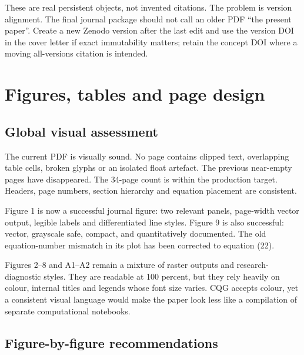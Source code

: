 \documentclass[11pt,a4paper]{article}
\begin{document}
These are real persistent objects, not invented citations. The problem is version alignment.
The final journal package should not call an older PDF ``the present paper''. Create a new
Zenodo version after the last edit and use the version DOI in the cover letter if exact
immutability matters; retain the concept DOI where a moving all-versions citation is intended.

\clearpage
\section{Figures, tables and page design}

\subsection{Global visual assessment}

The current PDF is visually sound. No page contains clipped text, overlapping table cells,
broken glyphs or an isolated float artefact. The previous near-empty pages have disappeared.
The 34-page count is within the production target. Headers, page numbers, section hierarchy and
equation placement are consistent.

Figure 1 is now a successful journal figure: two relevant panels, page-width vector output,
legible labels and differentiated line styles. Figure 9 is also successful: vector, grayscale
safe, compact, and quantitatively documented. The old equation-number mismatch in its plot has
been corrected to equation (22).

Figures 2--8 and A1--A2 remain a mixture of raster outputs and research-diagnostic styles. They
are readable at 100 percent, but they rely heavily on colour, internal titles and legends whose
font size varies. CQG accepts colour, yet a consistent visual language would make the paper look
less like a compilation of separate computational notebooks.

\subsection{Figure-by-figure recommendations}
\end{document}
